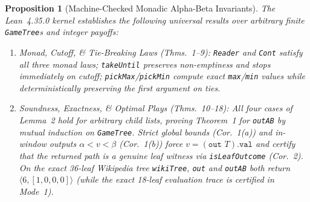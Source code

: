 \documentclass[10pt,twocolumn]{article}
\newtheorem{proposition}{Proposition}
\begin{document}
\begin{proposition}[Machine-Checked Monadic Alpha-Beta Invariants]\label{prop:lean}
The Lean~4.35.0 kernel establishes the following universal results over arbitrary finite \texttt{GameTree}s and integer payoffs:
\begin{enumerate}[leftmargin=*,nosep]
  \item \emph{Monad, Cutoff, \& Tie-Breaking Laws (Thms.~1--9):} \texttt{Reader} and \texttt{Cont} satisfy all three monad laws; \texttt{takeUntil} preserves non-emptiness and stops immediately on cutoff; \texttt{pickMax}/\texttt{pickMin} compute exact \texttt{max}/\texttt{min} values while deterministically preserving the first argument on ties.
  \item \emph{Soundness, Exactness, \& Optimal Plays (Thms.~10--18):} All four cases of Lemma~2 hold for arbitrary child lists, proving Theorem~1 for \texttt{outAB} by mutual induction on \texttt{GameTree}. Strict global bounds (Cor.~1(a)) and in-window outputs $\alpha < v < \beta$ (Cor.~1(b)) force $v = (\texttt{out } T).\texttt{val}$ and certify that the returned path is a genuine leaf witness via \texttt{isLeafOutcome} (Cor.~2). On the exact 36-leaf Wikipedia tree \texttt{wikiTree}, \texttt{out} and \texttt{outAB} both return $\langle 6, [1,0,0,0]\rangle$ (while the exact 18-leaf evaluation trace is certified in Mode~1).
\end{enumerate}
\end{proposition}
\end{document}
